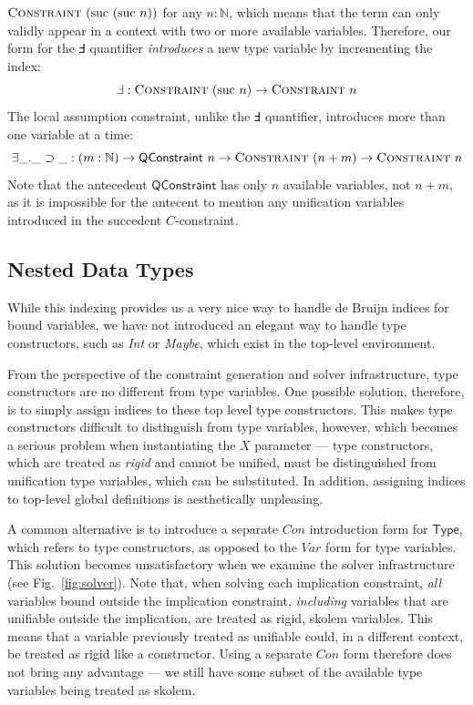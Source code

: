\documentclass[a4paper]{jfp}
\begin{document}
$\textsc{Constraint}\ (\text{suc}\ (\text{suc}\ n))$ for any $n : \mathbb{N}$, which means that the term can only validly appear in a context with
two or more available variables. Therefore, our form for the $\Finv$ quantifier \emph{introduces} a new type variable by incrementing the index:
\begin{displaymath}
   \Finv : \textsc{Constraint}\ (\text{suc}\ n) \rightarrow \textsc{Constraint}\ n \\
\end{displaymath}
The local assumption constraint, unlike the $\Finv$ quantifier, introduces more than one variable at a time:
\begin{displaymath}
   \exists\_.\_\supset\_ : (m : \mathbb{N}) \rightarrow \textsf{QConstraint}\ n \rightarrow \textsc{Constraint}\ (n + m) \rightarrow
   \textsc{Constraint}\ n
\end{displaymath}
Note that the antecedent $\textsf{QConstraint}$ has only $n$ available variables, not $n + m$, as it is impossible for the antecent to mention any
unification variables introduced in the succedent $C$-constraint. 

\subsection{Nested Data Types}

While this indexing provides us a very nice way to handle de Bruijn indices for bound variables, we have not introduced an elegant way to handle type
constructors, such as \emph{Int} or \emph{Maybe}, which exist in the top-level environment. 

From the perspective of the constraint generation and solver infrastructure, type constructors are no different from type variables. One possible
solution, therefore, is to simply assign indices to these top level type constructors. This makes type constructors difficult to distinguish
from type variables, however, which becomes a serious problem when instantiating the $X$ parameter --- type constructors, which are treated as
\emph{rigid} and cannot be unified, must be distinguished from unification type variables, which can be substituted. In addition, assigning indices to
top-level global definitions is aesthetically unpleasing.

A common alternative is to introduce a separate $\mathit{Con}$ introduction form for $\textsf{Type}$, which refers to type constructors, as opposed to
the $\mathit{Var}$ form for type variables. This solution becomes unsatisfactory when we examine the solver infrastructure (see
Fig.~\ref{fig:solver}). Note that, when solving each implication constraint, \emph{all} variables bound outside the implication constraint,
\emph{including} variables that are unifiable outside the implication, are treated as rigid, skolem variables. This means that a variable previously treated as unifiable
could, in a different context, be treated as rigid like a constructor. Using a separate $\mathit{Con}$ form therefore does not bring any advantage ---
we still have some subset of the available type variables being treated as skolem. 
\end{document}
